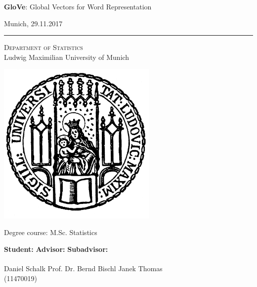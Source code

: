 \Large

\textbf{GloVe}: Global Vectors for Word Representation

\vspace{0.5cm}

\LARGE

Munich, 29.11.2017

\rule{\textwidth}{0.5pt}

\vspace{0.6cm}

\begin{center}
\LARGE
\textsc{Department of Statistics} \\
\Large
Ludwig Maximilian University of Munich
\end{center}

\vspace{0.5cm}

\includegraphics[height=8cm]{images/logos/LMU_logo.pdf}

\flushleft
\Large
\vspace*{\fill}
\begin{center}
Degree course: M.Sc. Statistics
\end{center}
\vspace{0.5cm}
\normalsize

\begin{tabbing}
\=\textbf{Student:}  \hspace{3cm}  \=\textbf{Advisor:}          \hspace{4.5cm}\=\textbf{Subadvisor:} \\ \\ 
\>Daniel Schalk       \> Prof. Dr. Bernd Bischl    \>Janek Thomas\\
\>(11470019)
\end{tabbing}

\thispagestyle{empty}

\normalsize

